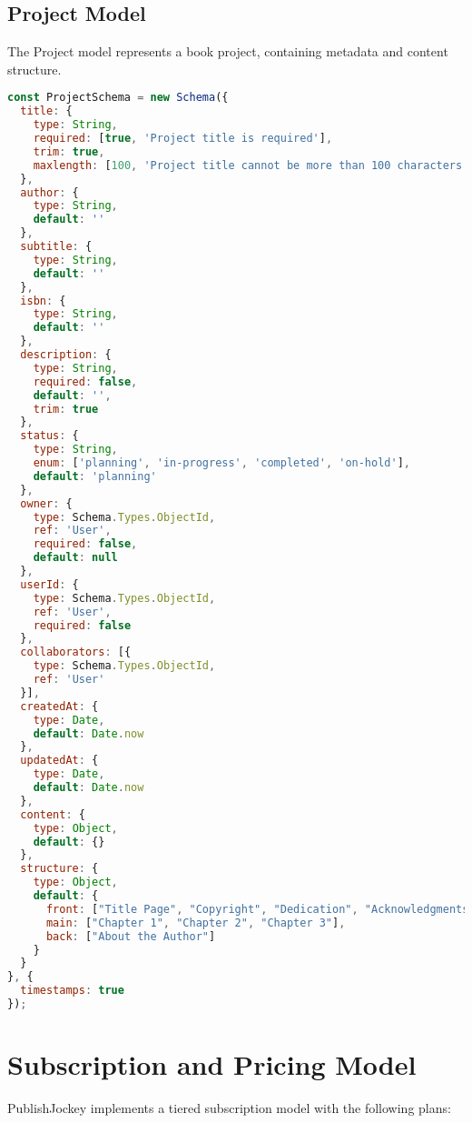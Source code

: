 \documentclass[12pt,a4paper]{book}
\begin{document}
\subsection{Project Model}

The Project model represents a book project, containing metadata and content structure.

\begin{lstlisting}[language=JavaScript, caption=Project Schema]
const ProjectSchema = new Schema({
  title: {
    type: String,
    required: [true, 'Project title is required'],
    trim: true,
    maxlength: [100, 'Project title cannot be more than 100 characters']
  },
  author: {
    type: String,
    default: ''
  },
  subtitle: {
    type: String,
    default: ''
  },
  isbn: {
    type: String,
    default: ''
  },
  description: {
    type: String,
    required: false,
    default: '',
    trim: true
  },
  status: {
    type: String,
    enum: ['planning', 'in-progress', 'completed', 'on-hold'],
    default: 'planning'
  },
  owner: {
    type: Schema.Types.ObjectId,
    ref: 'User',
    required: false,
    default: null
  },
  userId: {
    type: Schema.Types.ObjectId,
    ref: 'User',
    required: false
  },
  collaborators: [{
    type: Schema.Types.ObjectId,
    ref: 'User'
  }],
  createdAt: {
    type: Date,
    default: Date.now
  },
  updatedAt: {
    type: Date,
    default: Date.now
  },
  content: {
    type: Object,
    default: {}
  },
  structure: {
    type: Object,
    default: {
      front: ["Title Page", "Copyright", "Dedication", "Acknowledgments"],
      main: ["Chapter 1", "Chapter 2", "Chapter 3"],
      back: ["About the Author"]
    }
  }
}, {
  timestamps: true
});
\end{lstlisting}

\section{Subscription and Pricing Model}

PublishJockey implements a tiered subscription model with the following plans:
\end{document}
